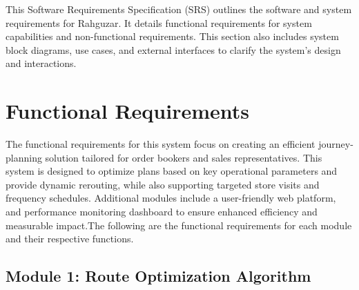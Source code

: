 This Software Requirements Specification (SRS) outlines the software and system requirements for Rahguzar. It details functional requirements for system capabilities and non-functional requirements. This section also includes system block diagrams, use cases, and external interfaces to clarify the system’s design and interactions.

\section{Functional Requirements}



The functional requirements for this system focus on creating an efficient journey-planning solution tailored for order bookers and sales representatives. This system is designed to optimize plans based on key operational parameters and provide dynamic rerouting, while also supporting targeted store visits and frequency schedules. Additional modules include a user-friendly web platform, and performance monitoring dashboard to ensure enhanced efficiency and measurable impact.The following are the functional requirements for each module and their respective functions.

\subsection*{Module 1: Route Optimization Algorithm}

